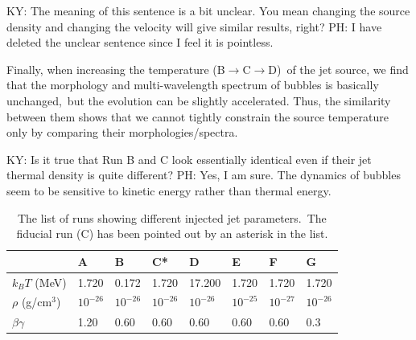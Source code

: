 \documentclass[fleqn,usenatbib,useAMS]{mnras}
\begin{document}
{\color{red} KY: The meaning of this sentence is a bit unclear. You mean changing the source density and changing the velocity will give similar results, right? PH: I have deleted the unclear sentence since I feel it is pointless.}

Finally, when increasing the temperature (B$\rightarrow$C$\rightarrow$D)\
of the jet source, we find that the morphology and multi-wavelength spectrum of bubbles is basically unchanged,\
but the evolution can be slightly accelerated.
Thus, the similarity between them shows that we cannot tightly constrain the source temperature
only by comparing their morphologies/spectra.



{\color{red} KY: Is it true that Run B and C look essentially identical even if their jet thermal density is quite different? PH: Yes, I am sure. The dynamics of bubbles seem to be sensitive to kinetic energy rather than thermal energy.}


\begin{table}
\raggedright
\caption{The list of runs showing different injected jet parameters.\
         The fiducial run (C) has been pointed out by an asterisk in the list. }
\label{tablb-jet-parameters}
\begin{tabular}{@{}llllllll@{}}
\toprule[1pt]\midrule[0.3pt]
                  & A          & B          & C*         & D           & E          & F          & G          \\ \midrule
$k_{B}T$ (MeV)    & 1.720      & 0.172      & 1.720      & 17.200      & 1.720      & 1.720      & 1.720      \\
$\rho$ (g/cm$^3$) & $10^{-26}$ & $10^{-26}$ & $10^{-26}$ & $10^{-26}$  & $10^{-25}$ & $10^{-27}$ & $10^{-26}$ \\
$\beta\gamma$     & 1.20       & 0.60       & 0.60       & 0.60        & 0.60       & 0.60       & 0.3       \\ \midrule
\end{tabular}
\end{table}


\end{document}
